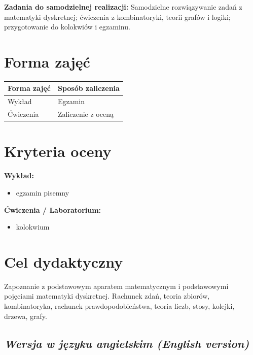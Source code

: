 \documentclass[12pt, a4paper]{article}
\newcommand{\thdrule}{\noalign{\global\setlength{\extrarowheight}{0pt}}}
\newcommand{\thdend}{\noalign{\global\setlength{\extrarowheight}{3pt}}}
\begin{document}
\vspace{4pt}
\noindent\textbf{Zadania do samodzielnej realizacji:} Samodzielne rozwiązywanie zadań z matematyki dyskretnej; ćwiczenia z kombinatoryki, teorii grafów i logiki; przygotowanie do kolokwiów i egzaminu.

\section{Forma zajęć}

\begin{center}
{\scriptsize
\begin{tabular}{m{5cm}m{8cm}}
\thdrule\toprule
\rowcolor{pjatkRed} {\color{white}\textbf{Forma zajęć}} & {\color{white}\textbf{Sposób zaliczenia}} \\
\midrule\thdend
  \rowcolor{tableRowLight} Wykład & Egzamin \\
  \rowcolor{tableRowAlt} Ćwiczenia & Zaliczenie z oceną \\
\bottomrule
\end{tabular}}
\end{center}

\section{Kryteria oceny}

\textbf{Wykład:}
\begin{itemize}
  \item egzamin pisemny
\end{itemize}
\vspace{4pt}
\textbf{Ćwiczenia / Laboratorium:}
\begin{itemize}
  \item kolokwium
\end{itemize}


\section{Cel dydaktyczny}

Zapoznanie z podstawowym aparatem matematycznym i podstawowymi pojęciami matematyki dyskretnej. Rachunek zdań, teoria zbiorów, kombinatoryka, rachunek prawdopodobieństwa, teoria liczb, stosy, kolejki, drzewa, grafy.

\subsection*{\textit{Wersja w języku angielskim (English version)}}
\end{document}
